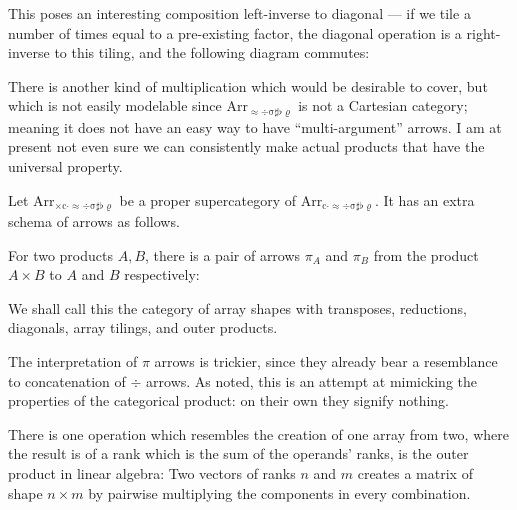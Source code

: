 \documentclass{DIKU-report-variant}
\newcommand\mrm[1]{\mathrm{#1}}
\newcommand\brm[1]{\bm{\mrm{#1}}}
\newcommand\Arr[1]{{\brm{Arr}_{\brm{#1}}}}
\newcommand\ADSSFR{\approx\div\sigma\sharp\flat\varrho}
\newcommand\CADSSFR{c\cdot\approx\div\sigma\sharp\flat\varrho}
\newcommand\XCADSSFR{\times c\cdot\approx\div\sigma\sharp\flat\varrho}
\begin{document}
This poses an interesting composition left-inverse to
diagonal --- if we tile a number of times equal to a pre-existing factor,
the diagonal operation is a right-inverse to this tiling, and the following
diagram commutes:

\begin{center}
\end{center}

There is another kind of multiplication which would be desirable to cover, but which is
not easily modelable since \(\Arr\ADSSFR\) is not a Cartesian category; meaning it does
not have an easy way to have ``multi-argument'' arrows. I am at present not even sure we can
consistently make actual products that have the universal property.

\begin{definition}
  \label{def:category-of-outer-products}
  Let \(\Arr\XCADSSFR\) be a proper supercategory of \(\Arr\CADSSFR\). It
  has an extra schema of arrows as follows.

  For two products \(A, B\), there is a pair of arrows \(\pi_A\) and \(\pi_B\)
  from the product \(A \times B\) to \(A\) and \(B\) respectively:
  \begin{center}
  \end{center}

  We shall call this the category of array shapes with transposes, reductions,
  diagonals, array tilings, and outer products.
\end{definition}

The interpretation of \(\pi\) arrows is trickier, since they already bear a resemblance
to concatenation of \(\div\) arrows. As noted, this is an attempt at mimicking
the properties of the categorical product: on their own they signify nothing.

There is one operation which resembles the creation of one array from two, where
the result is of a rank which is the sum of the operands' ranks, is the outer product
in linear algebra: Two vectors of ranks \(n\) and \(m\) creates a matrix of shape \(n\times m\)
by pairwise multiplying the components in every combination.
\end{document}
